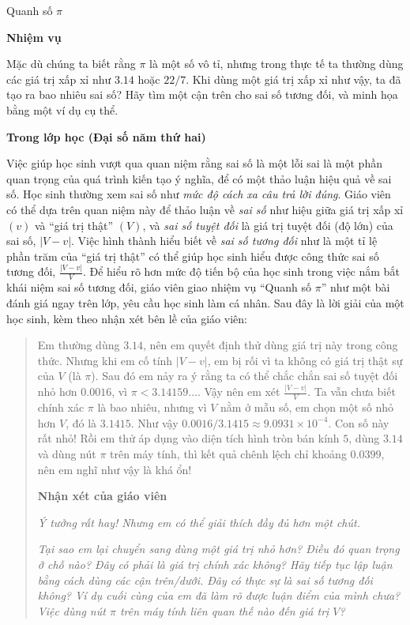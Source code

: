 \documentclass[
  10pt,
  a4paper,
  landscape,
  twoside,
  openany
]{scrbook}
\begin{document}
{Quanh số $\pi$}
{
\noindent
\textbf{Nhiệm vụ}

Mặc dù chúng ta biết rằng $\pi$ là một số vô tỉ, nhưng trong thực tế ta thường dùng các giá trị xấp xỉ như $3.14$ hoặc $22/7$. Khi dùng một giá trị xấp xỉ như vậy, ta đã tạo ra bao nhiêu sai số? Hãy tìm một cận trên cho sai số tương đối, và minh họa bằng một ví dụ cụ thể.

\noindent
\textbf{Trong lớp học (Đại số năm thứ hai)}

Việc giúp học sinh vượt qua quan niệm rằng sai số là một lỗi sai là một phần quan trọng của quá trình kiến tạo ý nghĩa, để có một thảo luận hiệu quả về sai số. Học sinh thường xem sai số như \emph{mức độ cách xa câu trả lời đúng}. Giáo viên có thể dựa trên quan niệm này để thảo luận về \emph{sai số} như hiệu giữa giá trị xấp xỉ $(v)$ và ``giá trị thật'' $(V)$, và \emph{sai số tuyệt đối} là giá trị tuyệt đối (độ lớn) của sai số, $\lvert V - v\rvert$. Việc hình thành hiểu biết về \emph{sai số tương đối} như là một tỉ lệ phần trăm của ``giá trị thật'' có thể giúp học sinh hiểu được công thức sai số tương đối, $\frac{\lvert V - v\rvert}{V}$. Để hiểu rõ hơn mức độ tiến bộ của học sinh trong việc nắm bắt khái niệm sai số tương đối, giáo viên giao nhiệm vụ ``Quanh số $\pi$'' như một bài đánh giá ngay trên lớp, yêu cầu học sinh làm cá nhân. Sau đây là lời giải của một học sinh, kèm theo nhận xét bên lề của giáo viên:

\begin{quote}
  Em thường dùng $3.14$, nên em quyết định thử dùng giá trị này trong công thức. Nhưng khi em cố tính $\lvert V - v\rvert$, em bị rối vì ta không có giá trị thật sự của $V$ (là $\pi$). Sau đó em nảy ra ý rằng ta có thể chắc chắn sai số tuyệt đối nhỏ hơn $0.0016$, vì $\pi < 3.14159\dots$. Vậy nên em xét $\frac{\lvert V - v\rvert}{V}$. Ta vẫn chưa biết chính xác $\pi$ là bao nhiêu, nhưng vì $V$ nằm ở mẫu số, em chọn một số nhỏ hơn $V$, đó là $3.1415$. Như vậy $0.0016 / 3.1415 \approx 9.0931 \times 10^{-4}$. Con số này rất nhỏ! Rồi em thử áp dụng vào diện tích hình tròn bán kính $5$, dùng $3.14$ và dùng nút $\pi$ trên máy tính, thì kết quả chênh lệch chỉ khoảng $0.0399$, nên em nghĩ như vậy là khá ổn!

  \textbf{Nhận xét của giáo viên}
  
  \emph{Ý tưởng rất hay! Nhưng em có thể giải thích đầy đủ hơn một chút.}

  \emph{Tại sao em lại chuyển sang dùng một giá trị nhỏ hơn? Điều đó quan trọng ở chỗ nào? Đây có phải là giá trị chính xác không? Hãy tiếp tục lập luận bằng cách dùng các cận trên/dưới. Đây có thực sự là sai số tương đối không? Ví dụ cuối cùng của em đã làm rõ được luận điểm của mình chưa? Việc dùng nút $\pi$ trên máy tính liên quan thế nào đến giá trị $V$?}
\end{quote}

}
\end{document}
